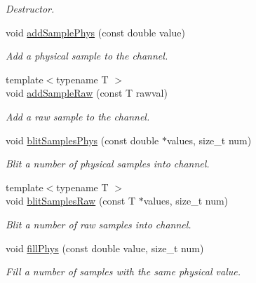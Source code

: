 \begin{DoxyCompactItemize}
\begin{DoxyCompactList}\small\item\em Destructor. \item\end{DoxyCompactList}\item 
void \hyperlink{classgdf_1_1_channel_aab748d2a7de10901b179c3ab0088e2bd}{addSamplePhys} (const double value)
\begin{DoxyCompactList}\small\item\em Add a physical sample to the channel. \item\end{DoxyCompactList}\item 
{\footnotesize template$<$typename T $>$ }\\void \hyperlink{classgdf_1_1_channel_af3f1c59ce05c2ce53f67e975475cae0b}{addSampleRaw} (const T rawval)
\begin{DoxyCompactList}\small\item\em Add a raw sample to the channel. \item\end{DoxyCompactList}\item 
void \hyperlink{classgdf_1_1_channel_a9283ade92e758c9b9d069cc2915e2166}{blitSamplesPhys} (const double $\ast$values, size\_\-t num)
\begin{DoxyCompactList}\small\item\em Blit a number of physical samples into channel. \item\end{DoxyCompactList}\item 
{\footnotesize template$<$typename T $>$ }\\void \hyperlink{classgdf_1_1_channel_a4dbee85af31381a4b60807938374d435}{blitSamplesRaw} (const T $\ast$values, size\_\-t num)
\begin{DoxyCompactList}\small\item\em Blit a number of raw samples into channel. \item\end{DoxyCompactList}\item 
void \hyperlink{classgdf_1_1_channel_a076665b0f8cfc07b99cf23bf40aabf46}{fillPhys} (const double value, size\_\-t num)
\begin{DoxyCompactList}\small\item\em Fill a number of samples with the same physical value. \item\end{DoxyCompactList}\item 

\end{DoxyCompactItemize}
